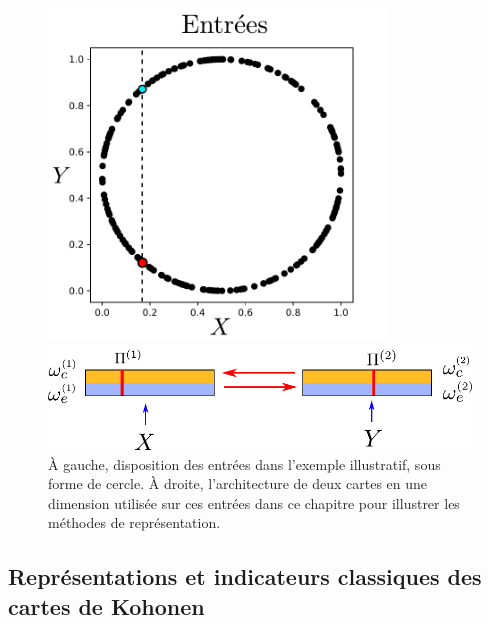 \documentclass[../main]{subfiles}
\begin{document}
\begin{figure}
\begin{minipage}{0.4\textwidth}
\centering
\includegraphics[width=0.8\textwidth]{2som_inp_noinformation}
\end{minipage}
\begin{minipage}{0.6\textwidth}
\includegraphics[width=\textwidth]{2som_archi}
\end{minipage}
\caption{\`A gauche, disposition des entrées dans l'exemple illustratif, sous forme de cercle. \`A droite, l'architecture de deux cartes en une dimension utilisée sur ces entrées dans ce chapitre pour illustrer les méthodes de représentation.\label{fig:exp}}
\end{figure}

\subsection{Représentations et indicateurs classiques des cartes de Kohonen}
\end{document}
